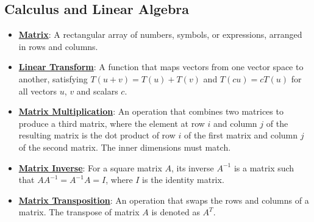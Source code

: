 \documentclass{article}%
\begin{document}
\subsection{Calculus and Linear Algebra}%
\label{subsec:CalculusandLinearAlgebra}%
\begin{itemize}[leftmargin=*]%
\item \href{https://purdue.brightspace.com/d2l/common/assets/pdfjs-d2l-dist/1.0.14-legacy/web/viewer.html?file=\%2Fcontent\%2Fenforced\%2F1095467-wl.202510.CS.24300.001\%2F04L1-Linear Algebra Primer.pdf\%3Fou\%3D1095467\&lang=en-us\&container=d2l-fileviewer-rendered-pdf\&fullscreen=d2l-fileviewer-rendered-pdf-dialog\&height=667#page=4}{\textbf{Matrix}}: A rectangular array of numbers, symbols, or expressions, arranged in rows and columns.%
\item \href{https://purdue.brightspace.com/d2l/common/assets/pdfjs-d2l-dist/1.0.14-legacy/web/viewer.html?file=\%2Fcontent\%2Fenforced\%2F1095467-wl.202510.CS.24300.001\%2F04L1-Linear Algebra Primer.pdf\%3Fou\%3D1095467\&lang=en-us\&container=d2l-fileviewer-rendered-pdf\&fullscreen=d2l-fileviewer-rendered-pdf-dialog\&height=667#page=5}{\textbf{Linear Transform}}: A function that maps vectors from one vector space to another, satisfying $T(u + v) = T(u) + T(v)$ and $T(cu) = cT(u)$ for all vectors $u$, $v$ and scalars $c$.%
\item \href{https://purdue.brightspace.com/d2l/common/assets/pdfjs-d2l-dist/1.0.14-legacy/web/viewer.html?file=\%2Fcontent\%2Fenforced\%2F1095467-wl.202510.CS.24300.001\%2F04L1-Linear Algebra Primer.pdf\%3Fou\%3D1095467\&lang=en-us\&container=d2l-fileviewer-rendered-pdf\&fullscreen=d2l-fileviewer-rendered-pdf-dialog\&height=667#page=14}{\textbf{Matrix Multiplication}}: An operation that combines two matrices to produce a third matrix, where the element at row $i$ and column $j$ of the resulting matrix is the dot product of row $i$ of the first matrix and column $j$ of the second matrix. The inner dimensions must match.%
\item \href{https://purdue.brightspace.com/d2l/common/assets/pdfjs-d2l-dist/1.0.14-legacy/web/viewer.html?file=\%2Fcontent\%2Fenforced\%2F1095467-wl.202510.CS.24300.001\%2F04L1-Linear Algebra Primer.pdf\%3Fou\%3D1095467\&lang=en-us\&container=d2l-fileviewer-rendered-pdf\&fullscreen=d2l-fileviewer-rendered-pdf-dialog\&height=667#page=10}{\textbf{Matrix Inverse}}: For a square matrix $A$, its inverse $A^{-1}$ is a matrix such that $AA^{-1} = A^{-1}A = I$, where $I$ is the identity matrix.%
\item \href{https://purdue.brightspace.com/d2l/common/assets/pdfjs-d2l-dist/1.0.14-legacy/web/viewer.html?file=\%2Fcontent\%2Fenforced\%2F1095467-wl.202510.CS.24300.001\%2F04L1-Linear Algebra Primer.pdf\%3Fou\%3D1095467\&lang=en-us\&container=d2l-fileviewer-rendered-pdf\&fullscreen=d2l-fileviewer-rendered-pdf-dialog\&height=667#page=16}{\textbf{Matrix Transposition}}: An operation that swaps the rows and columns of a matrix. The transpose of matrix $A$ is denoted as $A^T$.%

\end{itemize}
\end{document}
